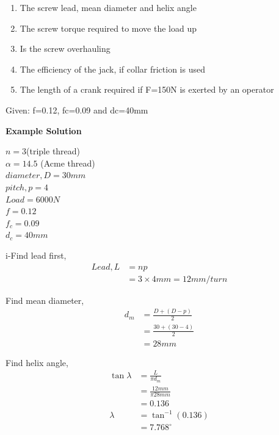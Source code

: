 \documentclass[a4paper, fleqn]{article}
\begin{document}
\begin{enumerate}[label=(\roman*)]
    \item The screw lead, mean diameter and helix angle
    \item The screw torque required to move the load up
    \item Is the screw overhauling
    \item The efficiency of the jack, if collar friction is used
    \item The length of a crank required if F=150N is exerted by an operator
\end{enumerate}

Given: f=0.12, fc=0.09 and dc=40mm

\vspace{10pt}
\textbf{Example Solution}
\vspace{10pt}

$n = 3$(triple thread)\\
$\alpha = 14.5$ (Acme thread)\\
$diameter,D = 30mm$\\
$pitch,p = 4$\\
$Load = 6000N$\\
$f = 0.12$\\
$f_c = 0.09$\\
$d_c = 40mm$\\
\vspace{10pt}

i-Find lead first,
\begin{equation*}
    \begin{aligned}
    Lead, L &=np\\
    &=3\times4mm = 12mm/turn    
    \end{aligned}
\end{equation*}

Find mean diameter,
\begin{equation*}
    \begin{aligned}
    d_m &= \frac {D+(D-p)}{2}\\  
    &= \frac {30+(30-4)}{2}\\ 
    &= 28mm
    \end{aligned}
\end{equation*}

Find helix angle,
\begin{equation*}
    \begin{aligned}
    \tan\lambda &= \frac{L}{\pi d_m}\\
    &= \frac{12mm}{\pi 28mm} \\
    &=0.136\\
    \lambda &= \tan^{-1}(0.136)\\
    &=7.768^{\circ}
    \end{aligned}
\end{equation*}
\end{document}
